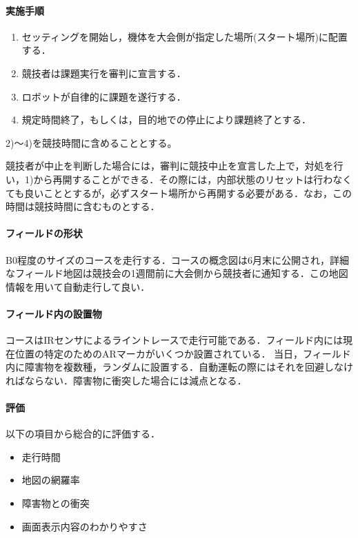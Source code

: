 \documentclass[submit]{ipsj}
\begin{document}
\paragraph*{実施手順}

\begin{enumerate}
\item セッティングを開始し，機体を大会側が指定した場所(スタート場所)に配置する．
\item 競技者は課題実行を審判に宣言する．
\item ロボットが自律的に課題を遂行する．
\item 規定時間終了，もしくは，目的地での停止により課題終了とする．
\end{enumerate}

2)〜4)を競技時間に含めることとする。

競技者が中止を判断した場合には，審判に競技中止を宣言した上で，対処を行い，1)から再開することができる．その際には，内部状態のリセットは行わなくても良いこととするが，必ずスタート場所から再開する必要がある．なお，この時間は競技時間に含むものとする．

\paragraph*{フィールドの形状}

B0程度のサイズのコースを走行する．コースの概念図は6月末に公開され，詳細なフィールド地図は競技会の1週間前に大会側から競技者に通知する．この地図情報を用いて自動走行して良い．

\paragraph*{フィールド内の設置物}

コースはIRセンサによるライントレースで走行可能である．フィールド内には現在位置の特定のためのARマーカがいくつか設置されている．
当日，フィールド内に障害物を複数種，ランダムに設置する．自動運転の際にはそれを回避しなければならない．障害物に衝突した場合には減点となる．

\paragraph*{評価}

以下の項目から総合的に評価する．
\begin{itemize}
\item 走行時間
\item 地図の網羅率
\item 障害物との衝突
\item 画面表示内容のわかりやすさ
\end{itemize}
\end{document}
